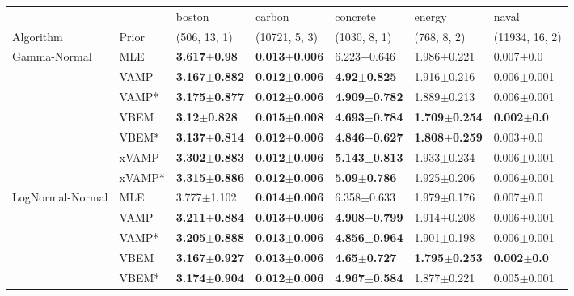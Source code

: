 \begin{tabular}{lllllll}
\toprule
       &     &                    boston &                    carbon &                  concrete &                    energy &                   naval \\
Algorithm & Prior& (506, 13, 1)& (10721, 5, 3)& (1030, 8, 1)& (768, 8, 2)& (11934, 16, 2)\\
\midrule
Gamma-Normal & MLE &   \textbf{3.617$\pm$0.98} &  \textbf{0.013$\pm$0.006} &           6.223$\pm$0.646 &           1.986$\pm$0.221 &           0.007$\pm$0.0 \\
       & VAMP &  \textbf{3.167$\pm$0.882} &  \textbf{0.012$\pm$0.006} &   \textbf{4.92$\pm$0.825} &           1.916$\pm$0.216 &         0.006$\pm$0.001 \\
       & VAMP* &  \textbf{3.175$\pm$0.877} &  \textbf{0.012$\pm$0.006} &  \textbf{4.909$\pm$0.782} &           1.889$\pm$0.213 &         0.006$\pm$0.001 \\
       & VBEM &   \textbf{3.12$\pm$0.828} &  \textbf{0.015$\pm$0.008} &  \textbf{4.693$\pm$0.784} &  \textbf{1.709$\pm$0.254} &  \textbf{0.002$\pm$0.0} \\
       & VBEM* &  \textbf{3.137$\pm$0.814} &  \textbf{0.012$\pm$0.006} &  \textbf{4.846$\pm$0.627} &  \textbf{1.808$\pm$0.259} &           0.003$\pm$0.0 \\
       & xVAMP &  \textbf{3.302$\pm$0.883} &  \textbf{0.012$\pm$0.006} &  \textbf{5.143$\pm$0.813} &           1.933$\pm$0.234 &         0.006$\pm$0.001 \\
       & xVAMP* &  \textbf{3.315$\pm$0.886} &  \textbf{0.012$\pm$0.006} &   \textbf{5.09$\pm$0.786} &           1.925$\pm$0.206 &         0.006$\pm$0.001 \\
LogNormal-Normal & MLE &           3.777$\pm$1.102 &  \textbf{0.014$\pm$0.006} &           6.358$\pm$0.633 &           1.979$\pm$0.176 &           0.007$\pm$0.0 \\
       & VAMP &  \textbf{3.211$\pm$0.884} &  \textbf{0.013$\pm$0.006} &  \textbf{4.908$\pm$0.799} &           1.914$\pm$0.208 &         0.006$\pm$0.001 \\
       & VAMP* &  \textbf{3.205$\pm$0.888} &  \textbf{0.013$\pm$0.006} &  \textbf{4.856$\pm$0.964} &           1.901$\pm$0.198 &         0.006$\pm$0.001 \\
       & VBEM &  \textbf{3.167$\pm$0.927} &  \textbf{0.013$\pm$0.006} &   \textbf{4.65$\pm$0.727} &  \textbf{1.795$\pm$0.253} &  \textbf{0.002$\pm$0.0} \\
       & VBEM* &  \textbf{3.174$\pm$0.904} &  \textbf{0.012$\pm$0.006} &  \textbf{4.967$\pm$0.584} &           1.877$\pm$0.221 &         0.005$\pm$0.001 \\

\end{tabular}
